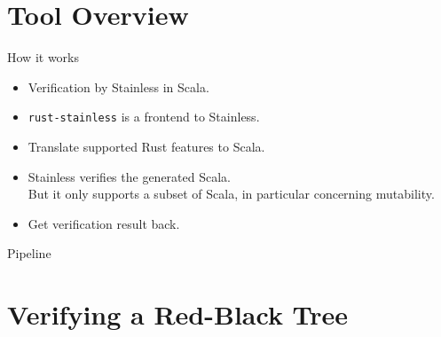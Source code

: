 \section{Tool Overview}

\begin{frame}{How it works}
\begin{itemize}
  \item Verification by Stainless in Scala.
  \item \texttt{rust-stainless} is a frontend to Stainless.
  \item Translate supported Rust features to Scala.
  \item Stainless verifies the generated Scala. \\
  But it only supports a subset of Scala, in particular concerning mutability.
  \item Get verification result back.
\end{itemize}
\end{frame}

\begin{frame}{Pipeline}
\centering

\end{frame}


\section{Verifying a Red-Black Tree}

